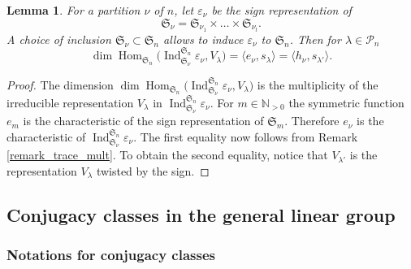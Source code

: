 \documentclass[11pt]{article}
\newcommand{\Subsection}{\subsection}
\let\epsilon\varepsilon
\theoremstyle{definition}
\theoremstyle{plain}
\newtheorem{lemma}[definition]{Lemma}
\DeclareMathOperator{\Hom}{Hom}
\DeclareMathOperator{\Ind}{Ind}
\newcommand{\Sym}{\mathfrak{S}}
\newcommand{\Part}{\mathcal{P}}
\begin{document}
\begin{lemma}\label{lemma_ind_sign}
For a partition $\nu$ of $n$, let $\epsilon_{\nu}$ be the sign representation of
\[
\Sym_{\nu}=\Sym_{\nu_1}\times\dots\times \Sym_{\nu_l}.
\]
A choice of inclusion $\Sym_{\nu}\subset \Sym_n$ allows to induce $\epsilon_{\nu}$ to $\Sym_n$. Then for $\lambda\in\Part_n$
\[
\dim \Hom_{\Sym_n} \bigl(\Ind_{\Sym_{\nu}}^{\Sym_n} \epsilon_{\nu}, V_{\lambda}\bigr)=\langle e_{\nu},s_{\lambda}\rangle =\langle h_{\nu},s_{\lambda'}\rangle.
\]
\end{lemma}
\begin{proof}
The dimension $\dim \Hom_{\Sym_n} \bigl(\Ind_{\Sym_{\nu}}^{\Sym_n} \epsilon_{\nu}, V_{\lambda}\bigr)$ is the multiplicity of the irreducible representation $V_{\lambda}$ in $\Ind_{\Sym_{\nu}}^{\Sym_n} \epsilon_{\nu}$. For $m\in \mathbb{N}_{>0}$ the symmetric function $e_{m}$ is the characteristic of the sign representation of $\Sym_m$. Therefore $e_{\nu}$ is the characteristic of $\Ind_{\Sym_{\nu}}^{\Sym_n} \epsilon_{\nu}$. The first equality now follows from Remark \ref{remark_trace_mult}.
To obtain the second equality, notice that $V_{\lambda'}$ is the representation $V_{\lambda}$ twisted by the sign.
\end{proof}

\Subsection{Conjugacy classes in the general linear group}\label{sect_conjugacy_classes}
\subsubsection{Notations for conjugacy classes}\label{subsect_notations_adjoint_conj}
\end{document}
